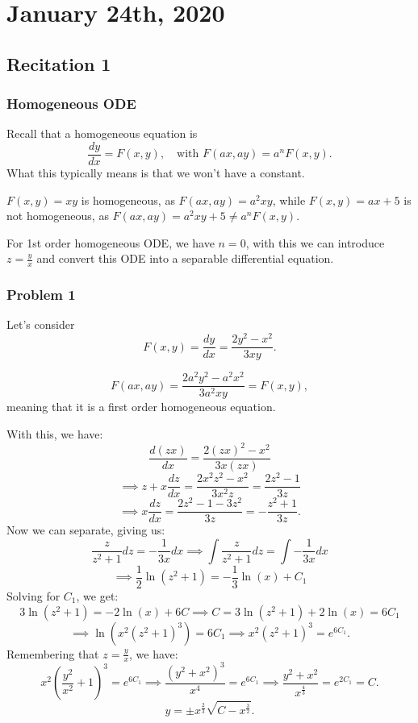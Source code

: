 \documentclass[../main/main.tex]{subfiles}
\begin{document}
\section{January 24th, 2020}
\subsection{Recitation 1}
\subsubsection{Homogeneous ODE}
Recall that a homogeneous equation is \[
	\frac{dy}{dx} = F(x,y),\quad\text{with }F(ax,ay)=a^{n}F(x,y)
.\] What this typically means is that we won't have a constant.
\begin{example}
	$F(x,y)=xy$ is homogeneous, as  $F(ax,ay)=a^2xy$, while $F(x,y)=ax+5$ is not homogeneous, as $F(ax,ay)=a^2xy+5\neq a^nF(x,y)$.
\end{example}
For 1st order homogeneous ODE, we have $n=0$, with this we can introduce  $z=\frac{y}{x}$ and convert this ODE into a separable differential equation.
\subsubsection{Problem 1}
\begin{example}
	Let's consider \[
	F(x,y)=\frac{dy}{dx}=\frac{2y^2-x^2}{3xy}
	.\] 
\end{example}
 \[
		F(ax,ay)=\frac{2a^2y^2-a^2x^2}{3a^2xy}=F(x,y)
	,\]  meaning that it is a first order homogeneous equation.

	With this, we have: \[
		\frac{d(zx)}{dx}=\frac{2(zx)^2-x^2}{3x(zx)}
	\] \[
	\implies z+x \frac{dz}{dx}= \frac{2x^2z^2-x^2}{3x^2z} = \frac{2z^2-1}{3z}
	\]  \[
	\implies x\frac{dz}{dx}= \frac{2z^2-1-3z^2}{3z}=-\frac{z^2+1}{3z}
	.\] Now we can separate, giving us: \[
	\frac{z}{z^2+1}dz=-\frac{1}{3x}dx \implies \int \frac{z}{z^2+1}dz = \int-\frac{1}{3x}dx
	\] \[
	\implies \frac{1}{2}\ln(z^2+1)=-\frac{1}{3}\ln(x)+C_1
	\] Solving for $C_1$, we get:  \[
	3\ln(z^2+1)=-2\ln(x)+6C \implies C=3\ln(z^2+1)+2\ln(x)=6C_1
	\] \[
	\implies \ln\left( x^2(z^2+1)^{3} \right) =6C_1 \implies x^2(z^2+1)^{3}=e^{6C_1}
	.\] Remembering that $z=\frac{y}{x}$, we have: \[
	x^2\left( \frac{y^2}{x^2}+1 \right) ^{3}=e^{6C_1} \implies \frac{(y^2+x^2)^{3}}{x^{4}}=e^{6C_1}\implies \frac{y^2+x^2}{x^{\frac{4}{3}}}=e^{2C_1} = C
	.\] \[
	y=\pm x^{\frac{2}{3}}\sqrt{C-x^{\frac{3}{2}}} 
	.\] 
\end{document}
